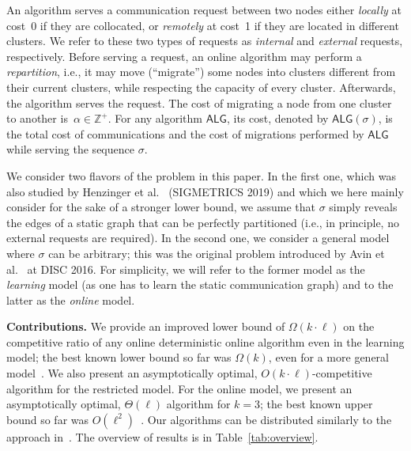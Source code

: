 \documentclass[manuscript,screen=true, review, anonymous]{acmart}
\newcommand{\ALG}{\textsf{ALG}\xspace}
\begin{document}
An algorithm serves a communication request between two nodes
either \emph{locally} at cost~0
if they are collocated,
or \emph{remotely} at cost~1
if they are located in different clusters.
We refer to these two types of requests as \emph{internal}
and \emph{external} requests, respectively.
Before serving a request,
an online algorithm may perform a \emph{repartition},
i.e.,
it may move (``migrate'') some nodes into clusters different from their current clusters, while respecting the capacity of every cluster. 
Afterwards, 
the algorithm serves the  request.
The cost of migrating a node from one cluster to another
is~$\alpha \in \mathbb{Z}^+$.
For any algorithm $\ALG$,
its cost,
denoted by $\ALG(\sigma)$,
is the total cost of communications and
the cost of migrations performed by $\ALG$ while serving the sequence $\sigma$.

We consider two flavors of the problem
in this paper. In the first one, which
was also studied by Henzinger et al.~\cite{sigmetrics19_partitioning}
(SIGMETRICS 2019) and which
we here mainly consider for the sake of a stronger
lower bound, we assume that $\sigma$
simply reveals the edges of a static graph
that can be perfectly partitioned
(i.e., in principle, no external requests
are required). 
In the second one, we consider a general
model where $\sigma$ can be arbitrary;
this was the original problem introduced
by Avin et al.~\cite{repartition-disc} at DISC 2016.
For simplicity, we will refer to the former
model as the \emph{learning} model (as
one has to learn the static communication graph) 
and to the latter as the \emph{online} model.


\noindent \textbf{Contributions.}
We provide an improved lower bound 
of $\Omega(k\cdot\ell)$ on the competitive ratio of any online deterministic online algorithm 
even in the learning model;
the best known lower bound so far was $\Omega(k)$,
even for a more general model~\cite{repartition-disc}.
We also present an asymptotically optimal, 
$O(k\cdot \ell)$-competitive algorithm
for the restricted model.
For the online model, we present  
an asymptotically optimal,
$\Theta(\ell)$ algorithm for $k=3$;
the best known upper bound 
so far was $O(\ell^2)$~\cite{repartition-disc}.
%
Our algorithms can be distributed
similarly to the approach in~\cite{sigmetrics19_partitioning}.
The overview of results is in Table~\ref{tab:overview}.
\end{document}
